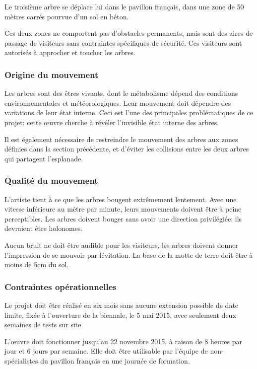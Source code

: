 \documentclass[french,A4paper,]{book}
\begin{document}
Le troisième arbre se déplace lui dans le pavillon français, dans une
zone de 50 mètres carrés pourvue d'un sol en béton.

Ces deux zones ne comportent pas d'obstacles permanents, mais sont des
aires de passage de visiteurs sans contraintes spécifiques de sécurité.
Ces visiteurs sont autorisés à approcher et toucher les arbres.

\subsubsection{Origine du mouvement}\label{origine-du-mouvement}

Les arbres sont des êtres vivants, dont le métabolisme dépend des
conditions environnementales et météorologiques. Leur mouvement doit
dépendre des variations de leur état interne. Ceci est l'une des
principales problématiques de ce projet: cette œuvre cherche à révéler
l'invisible état interne des arbres.

Il est également nécessaire de restreindre le mouvement des arbres aux
zones définies dans la section précédente, et d'éviter les collisions
entre les deux arbres qui partagent l'esplanade.

\subsubsection{Qualité du mouvement}\label{qualituxe9-du-mouvement-1}

L'artiste tient à ce que les arbres bougent extrêmement lentement. Avec
une vitesse inférieure au mètre par minute, leurs mouvements doivent
être à peine perceptibles. Les arbres doivent bouger sans avoir une
direction privilégiée: ils devraient être holonomes.

Aucun bruit ne doit être audible pour les visiteurs, les arbres doivent
donner l'impression de se mouvoir par lévitation. La base de la motte de
terre doit être à moins de 5cm du sol.

\subsubsection{Contraintes
opérationnelles}\label{contraintes-opuxe9rationnelles}

Le projet doit être réalisé en six mois sans aucune extension possible
de date limite, fixée à l'ouverture de la biennale, le 5 mai 2015, avec
seulement deux semaines de tests sur site.

L'œuvre doit fonctionner jusqu'au 22 novembre 2015, à raison de 8 heures
par jour et 6 jours par semaine. Elle doit être utilisable par l'équipe
de non-spécialistes du pavillon français en une journée de formation.
\end{document}
